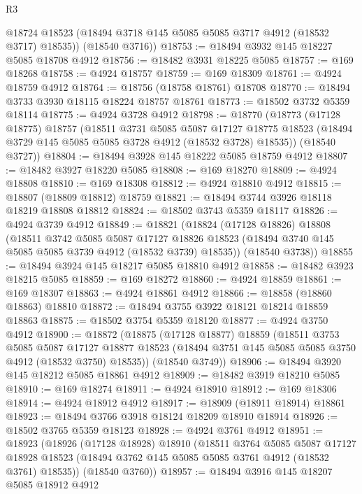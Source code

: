 \begin{lexlean}{R3}
\begin{coremodule}
        @18724
        @18523
        (@18494 @3718 @145 @5085 @5085 @3717 @4912 (@18532 @3717) @18535))
      (@18540 @3716))
@18753 := @18494 @3932 @145 @18227 @5085 @18708 @4912
@18756 := @18482 @3931 @18225 @5085
@18757 := @169 @18268
@18758 := @4924 @18757
@18759 := @169 @18309
@18761 := @4924 @18759 @4912
@18764 := @18756 (@18758 @18761) @18708
@18770 := @18494 @3733 @3930 @18115 @18224 @18757 @18761
@18773 := @18502 @3732 @5359 @18114
@18775 := @4924 @3728 @4912
@18798 := @18770
    (@18773
      (@17128 @18775)
      @18757
      (@18511
        @3731
        @5085
        @5087
        @17127
        @18775
        @18523
        (@18494 @3729 @145 @5085 @5085 @3728 @4912 (@18532 @3728) @18535))
      (@18540 @3727))
@18804 := @18494 @3928 @145 @18222 @5085 @18759 @4912
@18807 := @18482 @3927 @18220 @5085
@18808 := @169 @18270
@18809 := @4924 @18808
@18810 := @169 @18308
@18812 := @4924 @18810 @4912
@18815 := @18807 (@18809 @18812) @18759
@18821 := @18494 @3744 @3926 @18118 @18219 @18808 @18812
@18824 := @18502 @3743 @5359 @18117
@18826 := @4924 @3739 @4912
@18849 := @18821
    (@18824
      (@17128 @18826)
      @18808
      (@18511
        @3742
        @5085
        @5087
        @17127
        @18826
        @18523
        (@18494 @3740 @145 @5085 @5085 @3739 @4912 (@18532 @3739) @18535))
      (@18540 @3738))
@18855 := @18494 @3924 @145 @18217 @5085 @18810 @4912
@18858 := @18482 @3923 @18215 @5085
@18859 := @169 @18272
@18860 := @4924 @18859
@18861 := @169 @18307
@18863 := @4924 @18861 @4912
@18866 := @18858 (@18860 @18863) @18810
@18872 := @18494 @3755 @3922 @18121 @18214 @18859 @18863
@18875 := @18502 @3754 @5359 @18120
@18877 := @4924 @3750 @4912
@18900 := @18872
    (@18875
      (@17128 @18877)
      @18859
      (@18511
        @3753
        @5085
        @5087
        @17127
        @18877
        @18523
        (@18494 @3751 @145 @5085 @5085 @3750 @4912 (@18532 @3750) @18535))
      (@18540 @3749))
@18906 := @18494 @3920 @145 @18212 @5085 @18861 @4912
@18909 := @18482 @3919 @18210 @5085
@18910 := @169 @18274
@18911 := @4924 @18910
@18912 := @169 @18306
@18914 := @4924 @18912 @4912
@18917 := @18909 (@18911 @18914) @18861
@18923 := @18494 @3766 @3918 @18124 @18209 @18910 @18914
@18926 := @18502 @3765 @5359 @18123
@18928 := @4924 @3761 @4912
@18951 := @18923
    (@18926
      (@17128 @18928)
      @18910
      (@18511
        @3764
        @5085
        @5087
        @17127
        @18928
        @18523
        (@18494 @3762 @145 @5085 @5085 @3761 @4912 (@18532 @3761) @18535))
      (@18540 @3760))
@18957 := @18494 @3916 @145 @18207 @5085 @18912 @4912

\end{coremodule}
\end{lexlean}
